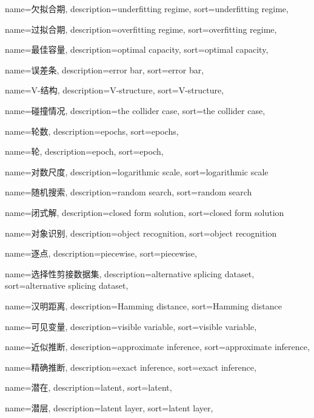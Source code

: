 {
  name=欠拟合期,
  description={underfitting regime},
  sort={underfitting regime},
}

{
  name=过拟合期,
  description={overfitting regime},
  sort={overfitting regime},
}

{
  name=最佳容量,
  description={optimal capacity},
  sort={optimal capacity},
}

{
  name=误差条,
  description={error bar},
  sort={error bar},
}

{
  name=V-结构,
  description={V-structure},
  sort={V-structure},
}

{
  name=碰撞情况,
  description={the collider case},
  sort={the collider case},
}

{
  name=轮数,
  description={epochs},
  sort={epochs},
}

{
  name=轮,
  description={epoch},
  sort={epoch},
}

{
  name=对数尺度,
  description={logarithmic scale},
  sort={logarithmic scale}
}

{
  name=随机搜索,
  description={random search},
  sort={random search}
}

{
  name=闭式解,
  description={closed form solution},
  sort={closed form solution}
}

{
  name=对象识别,
  description={object recognition},
  sort={object recognition}
}

{
  name=逐点,
  description={piecewise},
  sort={piecewise},
}

{
  name=选择性剪接数据集,
  description={alternative splicing dataset},
  sort={alternative splicing dataset},
}

{
  name=汉明距离,
  description={Hamming distance},
  sort={Hamming distance}
}

{
  name=可见变量,
  description={visible variable},
  sort={visible variable},
}

{
  name=近似推断,
  description={approximate inference},
  sort={approximate inference},
}

{
  name=精确推断,
  description={exact inference},
  sort={exact inference},
}

{
  name=潜在,
  description={latent},
  sort={latent},
}

{
  name=潜层,
  description={latent layer},
  sort={latent layer},
}
